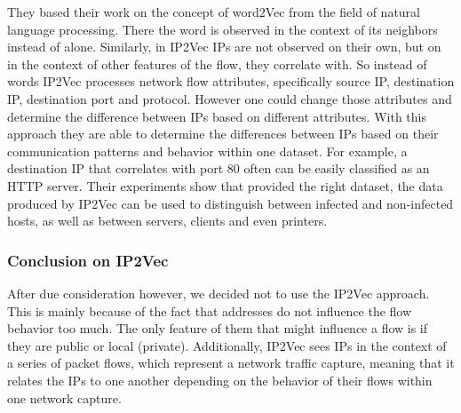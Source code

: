 \documentclass[
	ngerman,
	ruledheaders=section,%
	class=report,%
	thesis={type=bachelor},%
	accentcolor=9c,%
	custommargins=true,%
	marginpar=false,%
	parskip=half-,%
	fontsize=11pt,%
]{tudapub}
\begin{document}
They based their work on the concept of word2Vec from the field of natural language processing.
There the word is observed in the context of its neighbors instead of alone.
Similarly, in IP2Vec IPs are not observed on their own, but on in the context of other features of the flow, they correlate with.
So instead of words IP2Vec processes network flow attributes,
specifically source IP, destination IP, destination port and protocol.
However one could change those attributes and determine the difference between IPs based on different attributes.
With this approach they are able to determine the differences between IPs based on their communication patterns and behavior within one dataset.
For example, a destination IP that correlates with port 80 often can be easily classified as an HTTP server.
Their experiments show that provided the right dataset, the data produced by IP2Vec can be used to distinguish between infected and non-infected hosts, as well as between servers, clients and even printers.

\subsubsection{Conclusion on IP2Vec}
\label{sec:conclusionIP2Vec}




After due consideration however, we decided not to use the IP2Vec approach.
This is mainly because of the fact that addresses do not influence the flow behavior too much.
The only feature of them that might influence a flow is if they are public or local (private).
Additionally, IP2Vec sees IPs in the context of a series of packet flows, which represent a network traffic capture,
meaning that it relates the IPs to one another depending on the behavior of their flows within one network capture.
\end{document}
